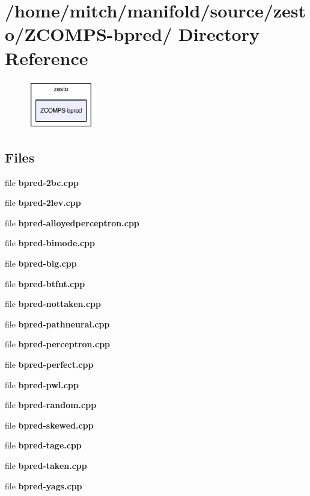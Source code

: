 \section{/home/mitch/manifold/source/zesto/ZCOMPS-bpred/ Directory Reference}
\label{dir_2851e92d8446f5ea9a23b69389a8af2a}


\nopagebreak
\begin{figure}[H]
\begin{center}
\leavevmode
\includegraphics[width=80pt]{dir_2851e92d8446f5ea9a23b69389a8af2a_dep}
\end{center}
\end{figure}
\subsection*{Files}
\begin{CompactItemize}
\item 
file {\bf bpred-2bc.cpp}
\item 
file {\bf bpred-2lev.cpp}
\item 
file {\bf bpred-alloyedperceptron.cpp}
\item 
file {\bf bpred-bimode.cpp}
\item 
file {\bf bpred-blg.cpp}
\item 
file {\bf bpred-btfnt.cpp}
\item 
file {\bf bpred-nottaken.cpp}
\item 
file {\bf bpred-pathneural.cpp}
\item 
file {\bf bpred-perceptron.cpp}
\item 
file {\bf bpred-perfect.cpp}
\item 
file {\bf bpred-pwl.cpp}
\item 
file {\bf bpred-random.cpp}
\item 
file {\bf bpred-skewed.cpp}
\item 
file {\bf bpred-tage.cpp}
\item 
file {\bf bpred-taken.cpp}
\item 
file {\bf bpred-yags.cpp}
\end{CompactItemize}
